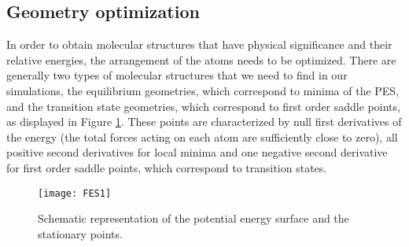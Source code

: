 \subsection{Geometry optimization}
In order to obtain molecular structures that have physical significance and their relative energies, the arrangement of the atoms needs to be optimized. There are generally two types of molecular structures that we need to find in our simulations, the equilibrium geometries, which correspond to minima of the PES, and the transition state geometries, which correspond to first order saddle points, as displayed in Figure \ref{fig:FES1}. These points are characterized by null first derivatives of the energy (the total forces acting on each atom are sufficiently close to zero), all positive second derivatives for local minima and one negative second derivative for first order saddle points, which correspond to transition states. 

\begin{figure}[!htbp]
	\centering
 	\texttt{[image: FES1]}
	\caption{Schematic representation of the potential energy surface and the stationary points.}
	\label{fig:FES1}
\end{figure}

